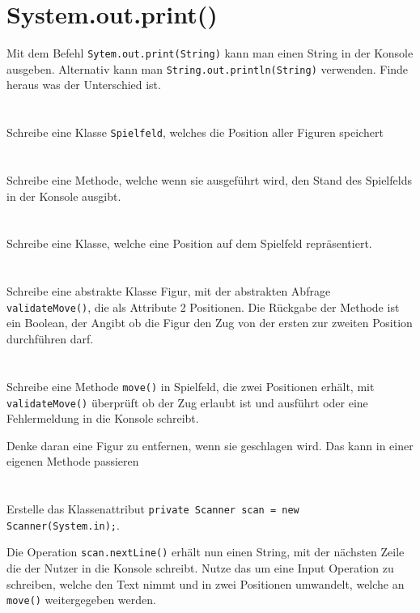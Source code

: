 \begin{questions}
    \begin{parts}
        \part{System.out.print()}
        Mit dem Befehl \texttt{Sytem.out.print(String)} kann man einen String in der Konsole ausgeben. Alternativ kann man \texttt{String.out.println(String)} verwenden. Finde heraus was der Unterschied ist.
        \part{}
        Schreibe eine Klasse \texttt{Spielfeld}, welches die Position aller Figuren speichert
        \part{}
        Schreibe eine Methode, welche wenn sie ausgeführt wird, den Stand des Spielfelds in der Konsole ausgibt.
        \part{}
        Schreibe eine Klasse, welche eine Position auf dem Spielfeld repräsentiert.
        \part{}
        Schreibe eine abstrakte Klasse Figur, mit der abstrakten Abfrage \texttt{validateMove()}, die als Attribute 2 Positionen. Die Rückgabe der Methode ist ein Boolean, der Angibt ob die Figur den Zug von der ersten zur zweiten Position durchführen darf.
        \part{}
        Schreibe eine Methode \texttt{move()} in Spielfeld, die zwei Positionen erhält, mit \texttt{validateMove()} überprüft ob der Zug erlaubt ist und ausführt oder eine Fehlermeldung in die Konsole schreibt.

        Denke daran eine Figur zu entfernen, wenn sie geschlagen wird. Das kann in einer eigenen Methode passieren
        \part{}
        Erstelle das Klassenattribut \texttt{private Scanner scan = new Scanner(System.in);}.

        Die Operation  \texttt{scan.nextLine()} erhält nun einen String, mit der nächsten Zeile die der Nutzer in die Konsole schreibt. Nutze das um eine Input Operation zu schreiben, welche den Text nimmt und in zwei Positionen umwandelt, welche an \texttt{move()} weitergegeben werden.


\end{parts}
\end{questions}
